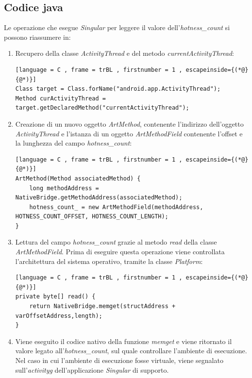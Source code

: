 \subsection*{Codice java}

Le operazione che esegue \emph{Singular} per leggere il valore dell'\emph{hotness\_count} si possono riassumere in:
\begin{enumerate}
    \item Recupero della classe \emph{ActivityThread} e del metodo \emph{currentActivityThread}:
\begin{lstlisting}[language = C , frame = trBL , firstnumber = 1 , escapeinside={(*@}{@*)}]
Class target = Class.forName("android.app.ActivityThread");
Method curActivityThread = target.getDeclaredMethod("currentActivityThread");
\end{lstlisting}
    \item Creazione di un nuovo oggetto \emph{ArtMethod}, contenente l'indirizzo dell'oggetto \emph{ActivityThread} e l'istanza di un oggetto \emph{ArtMethodField} contenente l'offset e la lunghezza del campo \emph{hotness\_count}:
\begin{lstlisting}[language = C , frame = trBL , firstnumber = 1 , escapeinside={(*@}{@*)}]
ArtMethod(Method associatedMethod) {
    long methodAddress = NativeBridge.getMethodAddress(associatedMethod);
    hotness_count_ = new ArtMethodField(methodAddress, HOTNESS_COUNT_OFFSET, HOTNESS_COUNT_LENGTH);
}
\end{lstlisting}    
    \item Lettura del campo \emph{hotness\_count} grazie al metodo \emph{read} della classe \emph{ArtMethodField}. Prima di eseguire questa operazione viene controllata l'architettura del sistema operativo, tramite la classe \emph{Platform}:
\begin{lstlisting}[language = C , frame = trBL , firstnumber = 1 , escapeinside={(*@}{@*)}]
private byte[] read() {
    return NativeBridge.memget(structAddress + varOffsetAddress,length);
}
\end{lstlisting}       

    \item Viene eseguito il codice nativo della funzione \emph{memget} e viene ritornato il valore legato all'\emph{hotness\_count}, sul quale controllare l'ambiente di esecuzione. Nel caso in cui l'ambiente di esecuzione fosse virtuale, viene segnalato sull'\emph{\gls{activityg}} dell'applicazione \emph{Singular} di supporto.
\end{enumerate}

